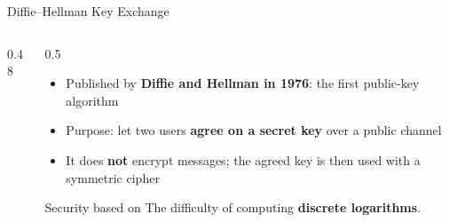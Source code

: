 \documentclass[aspectratio=169,11pt,xcolor={table}]{beamer}
\begin{document}
\begin{frame}{Diffie--Hellman Key Exchange}
  \begin{columns}[c]
    \begin{column}{0.48\textwidth}
      \centering
    \end{column}
    \begin{column}{0.5\textwidth}
      \begin{itemize}\small\setlength{\itemsep}{4pt}
        \item Published by \textbf{Diffie and Hellman in 1976}: the first public-key algorithm
        \item Purpose: let two users \textbf{agree on a secret key} over a public channel
        \item It does \textbf{not} encrypt messages; the agreed key is then used with a symmetric cipher
      \end{itemize}
      \begin{block}{Security based on}
        \small The difficulty of computing \textbf{discrete logarithms}.
      \end{block}
    \end{column}
  \end{columns}
\end{frame}
\end{document}
